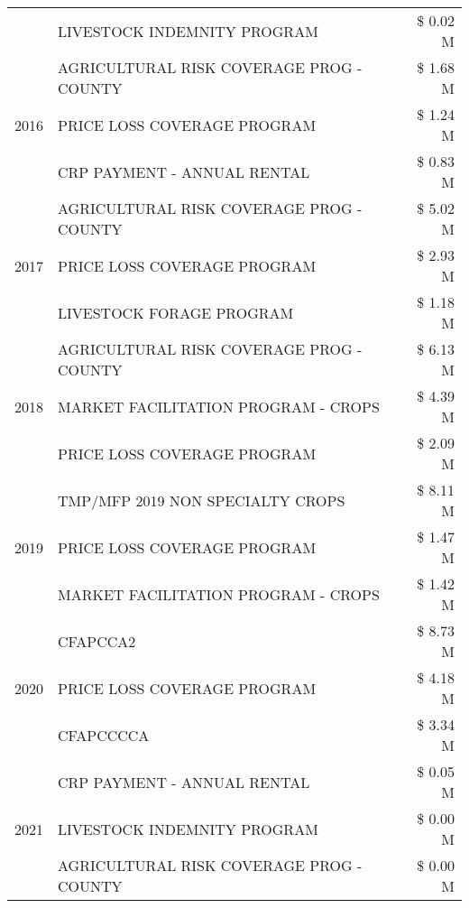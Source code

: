 \begin{tabular}{llr}
 & LIVESTOCK INDEMNITY PROGRAM & \$ 0.02 M \\
\cline{1-3}
\multirow[t]{3}{*}{2016} & AGRICULTURAL RISK COVERAGE PROG - COUNTY & \$ 1.68 M \\
 & PRICE LOSS COVERAGE PROGRAM & \$ 1.24 M \\
 & CRP PAYMENT - ANNUAL RENTAL & \$ 0.83 M \\
\cline{1-3}
\multirow[t]{3}{*}{2017} & AGRICULTURAL RISK COVERAGE PROG - COUNTY & \$ 5.02 M \\
 & PRICE LOSS COVERAGE PROGRAM & \$ 2.93 M \\
 & LIVESTOCK FORAGE PROGRAM & \$ 1.18 M \\
\cline{1-3}
\multirow[t]{3}{*}{2018} & AGRICULTURAL RISK COVERAGE PROG - COUNTY & \$ 6.13 M \\
 & MARKET FACILITATION PROGRAM - CROPS & \$ 4.39 M \\
 & PRICE LOSS COVERAGE PROGRAM & \$ 2.09 M \\
\cline{1-3}
\multirow[t]{3}{*}{2019} & TMP/MFP 2019 NON SPECIALTY CROPS & \$ 8.11 M \\
 & PRICE LOSS COVERAGE PROGRAM & \$ 1.47 M \\
 & MARKET FACILITATION PROGRAM - CROPS & \$ 1.42 M \\
\cline{1-3}
\multirow[t]{3}{*}{2020} & CFAPCCA2 & \$ 8.73 M \\
 & PRICE LOSS COVERAGE PROGRAM & \$ 4.18 M \\
 & CFAPCCCCA & \$ 3.34 M \\
\cline{1-3}
\multirow[t]{3}{*}{2021} & CRP PAYMENT - ANNUAL RENTAL & \$ 0.05 M \\
 & LIVESTOCK INDEMNITY PROGRAM & \$ 0.00 M \\
 & AGRICULTURAL RISK COVERAGE PROG - COUNTY & \$ 0.00 M \\
\cline{1-3}
\bottomrule
\end{tabular}
